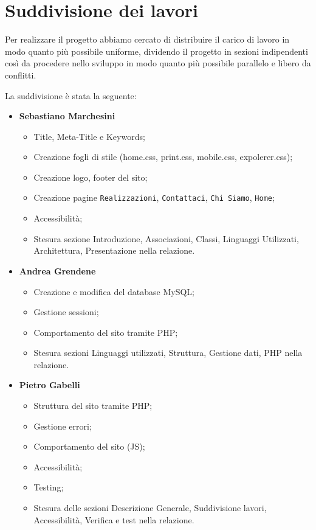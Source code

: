 \section{Suddivisione dei lavori}{
	Per realizzare il progetto abbiamo cercato di distribuire il carico di lavoro in modo quanto più possibile uniforme, dividendo il progetto in sezioni indipendenti così da procedere nello sviluppo in modo quanto più possibile parallelo e libero da conflitti.
	
	La suddivisione è stata la seguente: 	
	\begin{itemize}\itemsep1pt
		\item \textbf{Sebastiano Marchesini} 
		\begin{itemize}\itemsep1pt
			\item Title, Meta-Title e Keywords;
			\item Creazione fogli di stile (home.css, print.css, mobile.css, expolerer.css);
			\item Creazione logo, footer del sito;
			\item Creazione pagine \texttt{Realizzazioni}, \texttt{Contattaci}, \texttt{Chi Siamo}, \texttt{Home};
			\item Accessibilità;
			\item Stesura sezione Introduzione, Associazioni, Classi, Linguaggi Utilizzati, Architettura, Presentazione nella relazione.
		\end{itemize}
		\item \textbf{Andrea Grendene}
		\begin{itemize}\itemsep1pt
			\item Creazione e modifica del database MySQL;
			\item Gestione sessioni;
			\item Comportamento del sito tramite PHP;
			\item Stesura sezioni Linguaggi utilizzati, Struttura, Gestione dati, PHP nella relazione.
		\end{itemize}
		\item \textbf{Pietro Gabelli}
		\begin{itemize}\itemsep1pt
			\item Struttura del sito tramite PHP;
			\item Gestione errori;
			\item Comportamento del sito (JS);
			\item Accessibilità;
			\item Testing;
			\item Stesura delle sezioni Descrizione Generale, Suddivisione lavori, Accessibilità, Verifica e test nella relazione.
		\end{itemize}
	\end{itemize}
}
